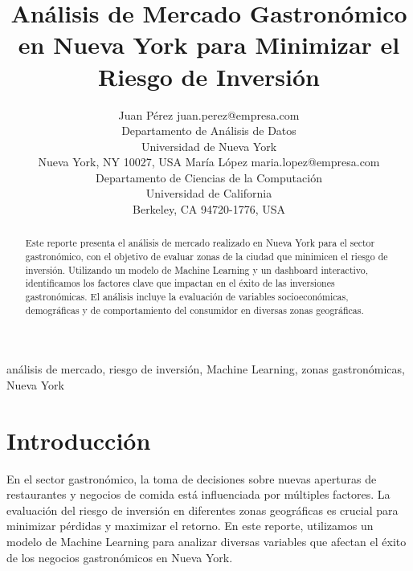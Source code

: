 \documentclass[twoside,11pt]{article}
\begin{document}
\title{Análisis de Mercado Gastronómico en Nueva York para Minimizar el Riesgo de Inversión}

\author{\name Juan Pérez \email juan.perez@empresa.com \\
       \addr Departamento de Análisis de Datos\\
       Universidad de Nueva York\\
       Nueva York, NY 10027, USA
       \AND
       \name María López \email maria.lopez@empresa.com \\
       \addr Departamento de Ciencias de la Computación\\
       Universidad de California\\
       Berkeley, CA 94720-1776, USA}


\maketitle

\begin{abstract}%
Este reporte presenta el análisis de mercado realizado en Nueva York para el sector gastronómico, con el objetivo de evaluar zonas de la ciudad que minimicen el riesgo de inversión. Utilizando un modelo de Machine Learning y un dashboard interactivo, identificamos los factores clave que impactan en el éxito de las inversiones gastronómicas. El análisis incluye la evaluación de variables socioeconómicas, demográficas y de comportamiento del consumidor en diversas zonas geográficas.
\end{abstract}

\begin{keywords}
  análisis de mercado, riesgo de inversión, Machine Learning, zonas gastronómicas, Nueva York
\end{keywords}

\section{Introducción}

En el sector gastronómico, la toma de decisiones sobre nuevas aperturas de restaurantes y negocios de comida está influenciada por múltiples factores. La evaluación del riesgo de inversión en diferentes zonas geográficas es crucial para minimizar pérdidas y maximizar el retorno. En este reporte, utilizamos un modelo de Machine Learning para analizar diversas variables que afectan el éxito de los negocios gastronómicos en Nueva York.
\end{document}
